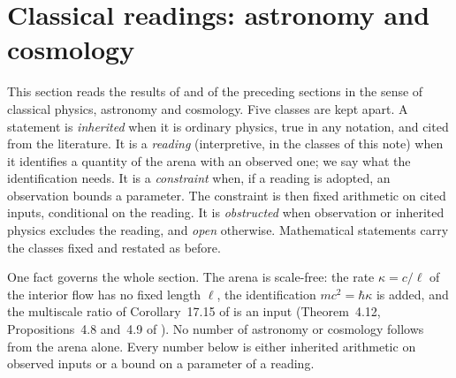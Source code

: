 \section{Classical readings: astronomy and cosmology}
\label{e7:sec:main}

This section reads the results of \cite{RE} and of the preceding sections in the sense of classical physics, astronomy and cosmology. Five
classes are kept apart. A statement is \emph{inherited} when it is ordinary physics, true in any notation, and cited from the literature. It is
a \emph{reading} (interpretive, in the classes of this note) when it identifies a quantity of the arena with an observed one; we say what the
identification needs. It is a \emph{constraint} when, if a reading is adopted, an observation bounds a parameter. The constraint is then fixed
arithmetic on cited inputs, conditional on the reading. It is \emph{obstructed} when observation or inherited physics excludes the reading, and
\emph{open} otherwise. Mathematical statements carry the classes fixed and restated as before.

One fact governs the whole section. The arena is scale-free: the rate $\kappa=c/\ell$ of the interior flow has no fixed length $\ell$, the
identification $mc^2=\hbar\kappa$ is added, and the multiscale ratio of Corollary~17.15 of \cite{ES17} is an input (Theorem~4.12,
Propositions~4.8 and~4.9 of \cite{RE}). No number of astronomy or cosmology follows from the arena alone. Every number below is either
inherited arithmetic on observed inputs or a bound on a parameter of a reading.

